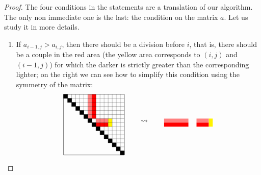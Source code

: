 \documentclass{amsart}
\theoremstyle{plain}
\theoremstyle{definition}
\begin{document}
\begin{proof}


  The four conditions in the statements are a translation of our algorithm. The only non immediate one is the last: the condition on the matrix $a$. Let us study it in more details.
  \begin{enumerate}
  \item If $a_{i-1, j} > a_{i, j}$, then there should be a division
    before $i$, that is, there should be a couple in the red area (the
    yellow area corresponds to $(i,j)$ and $(i-1,j)$) for which the
    darker is strictly greater than the corresponding lighter; on the
    right we can see how to simplify this condition using the symmetry
    of the matrix:
    \[
    \begin{tikzpicture}[xscale=0.2,yscale=-0.2,baseline=-40]
      \fill [yellow] (12,6) -- (12,8) -- (11,8) -- (11,6) -- cycle;
      \fill [red!50] (8,6) -- (8,7) -- (11,7) -- (11,6) -- cycle;
      \fill [red!100] (8,7) -- (8,8) -- (11,8) -- (11,7) -- cycle;
      \fill [red!50] (6,0) -- (6,6) -- (7,6) -- (7,0) -- cycle;
      \fill [red!100] (7,0) -- (7,6) -- (8,6) -- (8,0) -- cycle;

      \draw (0,0) -- (15,0) -- (15,15) -- (0,15) -- cycle;
      \foreach \x in {1,2,...,14}
      {
        \draw [very thin] (\x,\x) -- (15,\x);
        \draw [very thin] (\x,0) -- (\x,\x);
      }
      \foreach \x in {0,1,...,14}
        \filldraw (\x,\x) -- (\x,\x+1) -- (\x+1,\x+1) -- (\x+1,\x) -- cycle;
    \end{tikzpicture}
    \qquad \leadsto \qquad
    \begin{tikzpicture}[xscale=0.2,yscale=-0.2,baseline=-40]
      \fill [yellow] (12,6) -- (12,8) -- (11,8) -- (11,6) -- cycle;
      \fill [red!50] (8,6) -- (8,7) -- (11,7) -- (11,6) -- cycle;
      \fill [red!100] (8,7) -- (8,8) -- (11,8) -- (11,7) -- cycle;
      \fill [red!50] (0,6) -- (6,6) -- (6,7) -- (0,7) -- cycle;
      \fill [red!100] (0,7) -- (6,7) -- (6,8) -- (0,8) -- cycle;


\end{tikzpicture}\]
\end{enumerate}
\end{proof}
\end{document}

